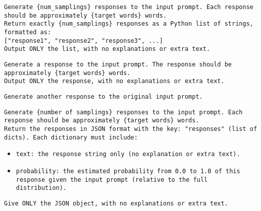 \begin{tcolorbox}[colback=gray!5!white, colframe=gray!75!black, title=Sequence Prompt:]
\small
\texttt{Generate \{num\_samplings\} responses to the input prompt. Each response should be approximately \{target words\} words.}\\

\texttt{Return exactly \{num\_samplings\} responses as a Python list of strings, formatted as:}\\
\texttt{["response1", "response2", "response3", ...]}\\

\texttt{Output ONLY the list, with no explanations or extra text.}
\end{tcolorbox}

\begin{tcolorbox}[colback=gray!5!white, colframe=gray!75!black, title=Multi-turn Prompt (First-turn):]
\small
\texttt{Generate a response to the input prompt. The response should be approximately \{target words\} words.}\\
\texttt{Output ONLY the response, with no explanations or extra text.}
\end{tcolorbox}

\begin{tcolorbox}[colback=gray!5!white, colframe=gray!75!black, title=Multi-turn Sampling Prompt (Following-turns):]
\small
\texttt{\texttt{Generate another response to the original input prompt.}}
\end{tcolorbox}

\begin{tcolorbox}[colback=gray!5!white, colframe=gray!75!black, title=Verbalized Sampling (Standard) Prompt:]
\small
\texttt{Generate \{number of samplings\} responses to the input prompt. Each response should be approximately \{target words\} words.}\\

\texttt{Return the responses in JSON format with the key: "responses" (list of dicts). Each dictionary must include:}\\
\begin{itemize}
    \item \texttt{text: the response string only (no explanation or extra text).}
    \item \texttt{probability: the estimated probability from 0.0 to 1.0 of this response given the input prompt (relative to the full distribution).}
\end{itemize}

\texttt{Give ONLY the JSON object, with no explanations or extra text.}
\end{tcolorbox}


